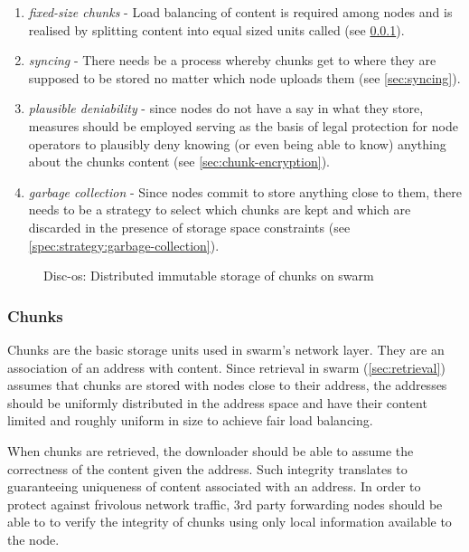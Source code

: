 \begin{enumerate}
    \item \emph{fixed-size chunks} - Load balancing of content is required among nodes and is realised by splitting content into equal sized units called   (see \ref{sec:chunks}).
    \item \emph{syncing} - There needs be a process whereby chunks get to where they are supposed to be stored no matter which node uploads them (see \ref{sec:syncing}).
    \item \emph{plausible deniability} - since nodes do not have a say in what they store, measures should be employed serving as the basis of legal protection for node operators to plausibly deny knowing (or even being able to know) anything about the chunks content (see \ref{sec:chunk-encryption}).
    \item \emph{garbage collection} - Since nodes commit to store anything close to them, there needs to be a strategy to select which chunks are kept and which are discarded in the presence of storage space constraints (see  \ref{spec:strategy:garbage-collection}). 
\end{enumerate}


\begin{figure}[htbp]
   \centering
   \caption{Disc-os:  Distributed immutable storage of chunks on swarm}
   \label{fig:discos}
\end{figure}

\subsubsection{Chunks}\label{sec:chunks}

Chunks are the basic storage units used in swarm's network layer. They are an association of an address with content.  Since retrieval in swarm (\ref{sec:retrieval}) assumes that chunks are stored with nodes close to their address,  the addresses should be uniformly distributed in the address space and have their content limited and roughly uniform in size to achieve fair load balancing.  

When  chunks are retrieved, the downloader should be able to assume the correctness of the content given the address. Such integrity translates to guaranteeing uniqueness of content associated with an address. In order to protect against frivolous network traffic, 3rd party forwarding nodes should be able to to verify the integrity of chunks using only local information available to the node.

